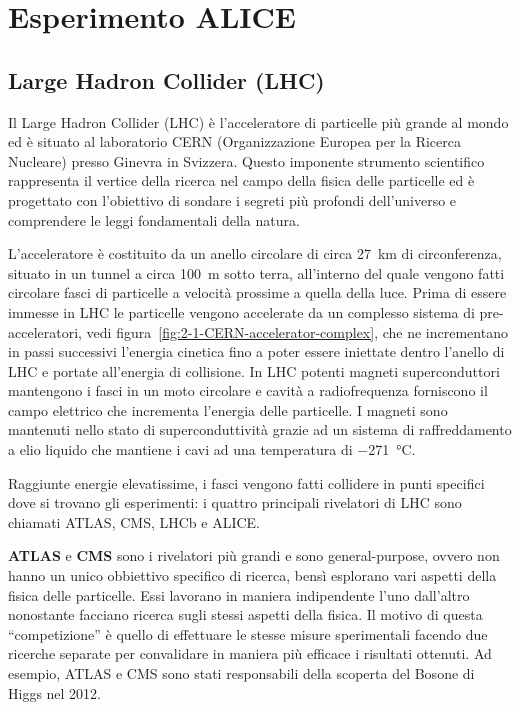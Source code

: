 \chapter{Esperimento ALICE}
\label{cha:2-ALICE}

\section{Large Hadron Collider (LHC)}
    Il Large Hadron Collider (LHC) è l’acceleratore di particelle più grande al mondo ed è situato al laboratorio CERN (Organizzazione Europea per la Ricerca Nucleare) presso Ginevra in Svizzera. Questo imponente strumento scientifico rappresenta il vertice della ricerca nel campo della fisica delle particelle ed è progettato con l’obiettivo di sondare i segreti più profondi dell’universo e comprendere le leggi fondamentali della natura.
    
    L’acceleratore è costituito da un anello circolare di circa \qty{27}{\kilo \meter} di circonferenza, situato in un tunnel a circa \qty{100}{\meter} sotto terra, all’interno del quale vengono fatti circolare fasci di particelle a velocità prossime a quella della luce. Prima di essere immesse in LHC le particelle vengono accelerate da un complesso sistema di pre-acceleratori, vedi figura~\ref{fig:2-1-CERN-accelerator-complex}, che ne incrementano in passi successivi l’energia cinetica fino a poter essere iniettate dentro l’anello di LHC e portate all’energia di collisione. In LHC potenti magneti superconduttori mantengono i fasci in un moto circolare e cavità a radiofrequenza forniscono il campo elettrico che incrementa l’energia delle particelle. I magneti sono mantenuti nello stato di superconduttività grazie ad un sistema di raffreddamento a elio liquido che mantiene i cavi ad una temperatura di \qty{-271}{\degreeCelsius}.
    
    Raggiunte energie elevatissime, i fasci vengono fatti collidere in punti specifici dove si trovano gli esperimenti: i quattro principali rivelatori di LHC sono chiamati ATLAS, CMS, LHCb e ALICE.

    \textbf{ATLAS} e \textbf{CMS} sono i rivelatori più grandi e sono general-purpose, ovvero non hanno un unico obbiettivo specifico di ricerca, bensì esplorano vari aspetti della fisica delle particelle. Essi lavorano in maniera indipendente l’uno dall’altro nonostante facciano ricerca sugli stessi aspetti della fisica. Il motivo di questa ``competizione'' è quello di effettuare le stesse misure sperimentali facendo due ricerche separate per convalidare in maniera più efficace i risultati ottenuti. Ad esempio, ATLAS e CMS sono stati responsabili della scoperta del Bosone di Higgs nel 2012.


